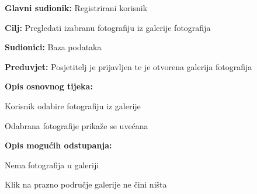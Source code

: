 					\noindent {}
					\begin{packed_item}
						
						\item \textbf{Glavni sudionik: }Registrirani korisnik
						\item  \textbf{Cilj:} Pregledati izabranu fotografiju iz galerije fotografija
						\item  \textbf{Sudionici:} Baza podataka
						\item  \textbf{Preduvjet:} Posjetitelj je prijavljen te je otvorena galerija fotografija
						\item  \textbf{Opis osnovnog tijeka:}
						
						\item[] \begin{packed_enum}
							
							\item Korisnik odabire fotografiju iz galerije
							\item Odabrana fotografije prikaže se uvećana
						\end{packed_enum}
						
						\item  \textbf{Opis mogućih odstupanja:}
						
						\item[] \begin{packed_item}
							
							\item[1.a] Nema fotografija u galeriji
							\item[] \begin{packed_enum}
								
								\item Klik na prazno područje galerije ne čini ništa
								
							\end{packed_enum}
							
						\end{packed_item}
					\end{packed_item}
					
